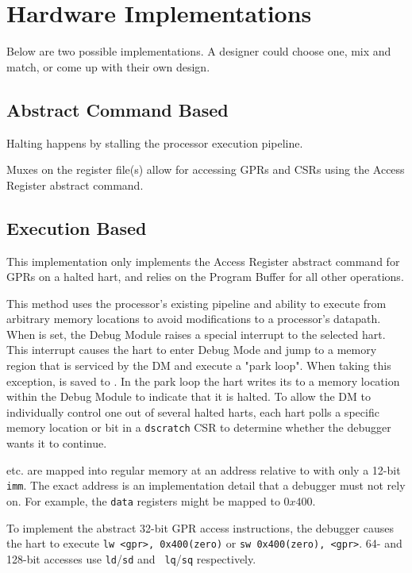 \chapter{Hardware Implementations}
\label{sec:implementations}

Below are two possible implementations. A designer could choose one, mix and
match, or come up with their own design.

\section{Abstract Command Based}

Halting happens by stalling the processor execution pipeline.

Muxes on the register file(s) allow for accessing GPRs and CSRs
using the Access Register abstract command.

\section{Execution Based}

This implementation only implements the Access Register abstract command
for GPRs on a halted hart, and relies on the Program Buffer for all other
operations.

This method uses the processor's existing pipeline
and ability to execute from arbitrary memory locations to avoid
modifications to a processor's datapath.
When \Fhaltreq is set, the Debug Module raises a special interrupt
to the selected hart. This interrupt causes the
hart to enter Debug Mode and jump to a 
memory region that is serviced by the DM and execute a "park loop".
When taking this exception, \Rpc is saved to \Rdpc.
In
the park loop the hart writes its \Rmhartid to a memory location within the Debug
Module to indicate that it is halted.
To allow the DM to individually control one out of several
halted harts, each hart polls a specific memory location or bit in a {\tt dscratch}
CSR to determine whether the debugger wants it to continue.

\Rdatazero etc. are mapped into regular memory at an address relative to \Rzero
with only a 12-bit {\tt imm}. The exact address is an implementation
detail that a debugger must not rely on. For example, the {\tt data}
registers might be mapped to $0x400$.

To implement the abstract 32-bit GPR access instructions, the debugger causes
the hart to  execute {\tt lw <gpr>, 0x400(zero)} or {\tt sw 0x400(zero), <gpr>}.
64- and 128-bit accesses use {\tt ld}/{\tt sd} and {\tt
lq}/{\tt sq} respectively.

